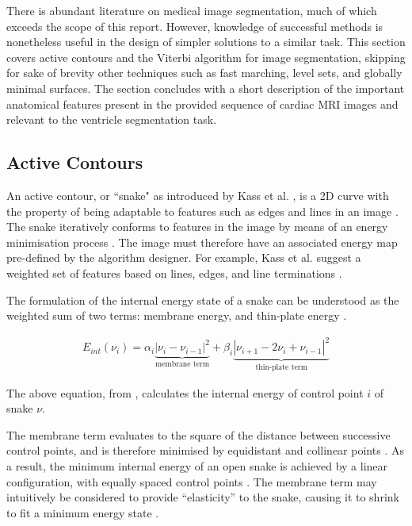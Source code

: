 There is abundant literature on medical image segmentation, much of which exceeds the scope of this report. However, knowledge of successful methods is nonetheless useful in the design of simpler solutions to a similar task. This section covers active contours and the Viterbi algorithm for image segmentation, skipping for sake of brevity other techniques such as fast marching, level sets, and globally minimal surfaces. The section concludes with a short description of the important anatomical features present in the provided sequence of cardiac MRI images and relevant to the ventricle segmentation task.

\subsection{Active Contours}

An active contour, or ``snake" as introduced by Kass et al. \cite{kass_1988}, is a 2D curve with the property of being adaptable to features such as edges and lines in an image \cite{biswas_2007}. The snake iteratively conforms to features in the image by means of an energy minimisation process \cite{biswas_2007}. The image must therefore have an associated energy map pre-defined by the algorithm designer. For example, Kass et al. \cite{kass_1988} suggest a weighted set of features based on lines, edges, and line terminations \cite{biswas_2007}.

The formulation of the internal energy state of a snake can be understood as the weighted sum of two terms: membrane energy, and thin-plate energy \cite{biswas_2007}.

\begin{align}
  E_{int}(\nu_i) = \alpha_i \underbrace{| \nu_i - \nu_{i-1}|^2}_{\text{membrane term}} +
                   \beta_i \underbrace{| \nu_{i+1} - 2\nu_i + \nu_{i-1}|^2}_{\text{thin-plate term}}
\end{align}

The above equation, from \cite{biswas_2007}, calculates the internal energy of control point $i$ of snake $\nu$.

The membrane term evaluates to the square of the distance between successive control points, and is therefore minimised by equidistant and collinear points \cite{biswas_2007}. As a result, the minimum internal energy of an open snake is achieved by a linear configuration, with equally spaced control points \cite{biswas_2007}. The membrane term may intuitively be considered to provide ``elasticity'' to the snake, causing it to shrink to fit a minimum energy state \cite{biswas_2007}.

